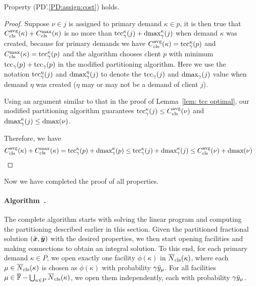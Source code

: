 \begin{lemma}\label{lem: PD1: primary optimal}
  Property (PD'.\ref{PD:assign:cost}) holds.
\end{lemma}
\begin{proof}
  Suppose $\nu \in j$ is assigned to primary demand $\kappa \in p$, it
  is then true that $C_{\text{cls}}^{{\mbox{\scriptsize\rm avg}}}(\kappa) + C_{\text{cls}}^{\max}(\kappa)$ is no more
  than $\mbox{\rm{tcc}}_\gamma^\kappa(j) + \text{dmax}_{\gamma}^\kappa(j)$ when demand
  $\kappa$ was created, because for primary demands we have
  $C_{\text{cls}}^{{\mbox{\scriptsize\rm avg}}}(\kappa) = \mbox{\rm{tcc}}_\gamma^\kappa (p)$ and $C_{\text{cls}}^{\max}(\kappa) =
  \mbox{\rm{tcc}}_{\gamma}^\kappa(p)$ and the algorithm chooses client $p$ with
  minimum $\mbox{\rm{tcc}}_{\gamma}(p) + \mbox{\rm{tcc}}_{\gamma}(p)$ in the modified
  partitioning algorithm. Here we use the notation
  $\mbox{\rm{tcc}}_{\gamma}^\eta(j)$ and $\text{dmax}_{\gamma}^\eta(j)$ to denote the
  $\mbox{\rm{tcc}}_\gamma(j)$ and $\text{dmax}_{\gamma}(j)$ value when demand $\eta$
  was created ($\eta$ may or may not be a demand of client $j$).

  Using an argument similar to that in the proof of Lemma~\ref{lem:
    tcc optimal}, our modified partitioning algorithm guarantees
  $\mbox{\rm{tcc}}_{\gamma}^{\kappa}(j) \leq C_{\text{cls}}^{{\mbox{\scriptsize\rm avg}}}(\nu)$ and
  $\text{dmax}_{\gamma}^{\kappa}(j) \leq \text{dmax}(\nu)$.

  Therefore, we have
  \begin{equation*}
    C_{\text{cls}}^{{\mbox{\scriptsize\rm avg}}}(\kappa) + C_{\text{cls}}^{\max}(\kappa) = \mbox{\rm{tcc}}_{\gamma}^{\kappa}(p) +
    \text{dmax}_{\gamma}^{\kappa}(p) \leq \mbox{\rm{tcc}}_{\gamma}^{\kappa}(j) +
    \text{dmax}_{\gamma}^{\kappa}(j) \leq C_{\text{cls}}^{{\mbox{\scriptsize\rm avg}}}(\nu) + \text{dmax}(\nu)
  \end{equation*}
\end{proof}
Now we have completed the proof of all properties.

\paragraph{Algorithm~{\EBGS}.}
The complete algorithm starts with solving the linear program and
computing the partitioning described earlier in this section.
Given the partitioned fractional solution $(\bar{\boldsymbol{x}},
\bar{\boldsymbol{y}})$ with the desired properties, we then start opening
facilities and making connections to obtain an integral
solution. To this end, for each primary demand $\kappa\in P$,
we open exactly one facility $\phi(\kappa)$ in ${\overline{N}}_{\text{cls}}(\kappa)$,
where each $\mu\in{\overline{N}}_{\text{cls}}(\kappa)$ is chosen as $\phi(\kappa)$ with probability
$\gamma{\bar y}_{\mu}$. For all facilities
 $\mu\in\overline{\mathbb{F}} - \bigcup_{\kappa\in P}{\overline{N}}_{\text{cls}}(\kappa)$,
we open them independently, each with
probability $\gamma{\bar y}_{\mu}$. 

